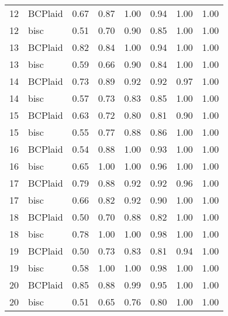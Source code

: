 \begin{table}[ht]
\begin{tabular}{rlrrrrrr}
   12 & BCPlaid & 0.67 & 0.87 & 1.00 & 0.94 & 1.00 & 1.00 \\ 
   12 & bisc & 0.51 & 0.70 & 0.90 & 0.85 & 1.00 & 1.00 \\ 
   13 & BCPlaid & 0.82 & 0.84 & 1.00 & 0.94 & 1.00 & 1.00 \\ 
   13 & bisc & 0.59 & 0.66 & 0.90 & 0.84 & 1.00 & 1.00 \\ 
   14 & BCPlaid & 0.73 & 0.89 & 0.92 & 0.92 & 0.97 & 1.00 \\ 
   14 & bisc & 0.57 & 0.73 & 0.83 & 0.85 & 1.00 & 1.00 \\ 
   15 & BCPlaid & 0.63 & 0.72 & 0.80 & 0.81 & 0.90 & 1.00 \\ 
   15 & bisc & 0.55 & 0.77 & 0.88 & 0.86 & 1.00 & 1.00 \\ 
   16 & BCPlaid & 0.54 & 0.88 & 1.00 & 0.93 & 1.00 & 1.00 \\ 
   16 & bisc & 0.65 & 1.00 & 1.00 & 0.96 & 1.00 & 1.00 \\ 
   17 & BCPlaid & 0.79 & 0.88 & 0.92 & 0.92 & 0.96 & 1.00 \\ 
   17 & bisc & 0.66 & 0.82 & 0.92 & 0.90 & 1.00 & 1.00 \\ 
   18 & BCPlaid & 0.50 & 0.70 & 0.88 & 0.82 & 1.00 & 1.00 \\ 
   18 & bisc & 0.78 & 1.00 & 1.00 & 0.98 & 1.00 & 1.00 \\ 
   19 & BCPlaid & 0.50 & 0.73 & 0.83 & 0.81 & 0.94 & 1.00 \\ 
   19 & bisc & 0.58 & 1.00 & 1.00 & 0.98 & 1.00 & 1.00 \\ 
   20 & BCPlaid & 0.85 & 0.88 & 0.99 & 0.95 & 1.00 & 1.00 \\ 
   20 & bisc & 0.51 & 0.65 & 0.76 & 0.80 & 1.00 & 1.00 \\ 
   \bottomrule
\end{tabular}
\end{table}
